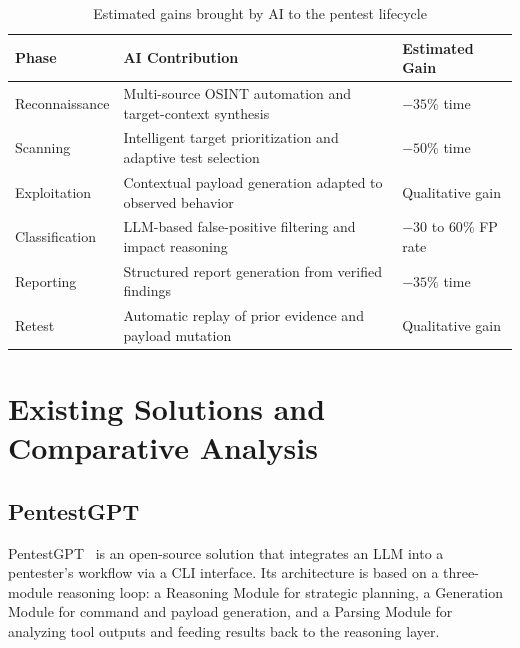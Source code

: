 \documentclass[12pt,a4paper]{report}
\begin{document}
\begin{table}[H]
    \centering
    \renewcommand{\arraystretch}{1.35}
    \begin{tabular}{|p{}|p{}|p{}|}
        \hline
        \textbf{Phase} & \textbf{AI Contribution} & \textbf{Estimated Gain} \\
        \hline
        Reconnaissance & Multi-source OSINT automation and
        target-context synthesis~\cite{bishopfoxAI} &
        $-35\%$ time \\
        \hline
        Scanning & Intelligent target prioritization and
        adaptive test selection~\cite{brightdefense2026} &
        $-50\%$ time \\
        \hline
        Exploitation & Contextual payload generation adapted
        to observed behavior~\cite{autosecagent2026} &
        Qualitative gain \\
        \hline
        Classification & LLM-based false-positive filtering
        and impact reasoning~\cite{threatexploitFP} &
        $-30$ to $60\%$ FP rate \\
        \hline
        Reporting & Structured report generation from verified
        findings~\cite{bishopfoxAI} &
        $-35\%$ time \\
        \hline
        Retest & Automatic replay of prior evidence and
        payload mutation~\cite{autosecagent2026} &
        Qualitative gain \\
        \hline
    \end{tabular}
    \caption{Estimated gains brought by AI to the pentest lifecycle}
    \label{tab:ai_gains}
\end{table}
\section{Existing Solutions and Comparative Analysis}

\subsection{PentestGPT}

PentestGPT~\cite{pentestgpt2023} is an open-source solution that integrates an LLM
into a pentester's workflow via a CLI interface. Its architecture is based on a
three-module reasoning loop: a Reasoning Module for strategic planning, a Generation
Module for command and payload generation, and a Parsing Module for analyzing tool
outputs and feeding results back to the reasoning layer.
\end{document}
